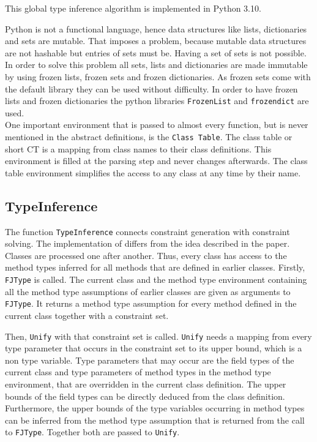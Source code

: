 This global type inference algorithm is implemented in Python 3.10.

Python is not a functional language, hence data structures like lists, dictionaries and sets are mutable. That imposes a problem, because mutable data structures are not hashable but entries of sets must be. Having a set of sets is not possible.
In order to solve this problem all sets, lists and dictionaries are made immutable by using frozen lists, frozen sets and frozen dictionaries. As frozen sets come with the default library they can be used without difficulty. In order to have frozen lists and frozen dictionaries the python libraries \verb|FrozenList| and \verb|frozendict| are used.\\
One important environment that is passed to almost every function, but is never mentioned in the abstract definitions, is the \verb|Class Table|. The class table or short CT is a mapping from class names to their class definitions. This environment is filled at the parsing step and never changes afterwards. The class table environment simplifies the access to any class at any time by their name.\\

\subsection{TypeInference}

The function \verb|TypeInference| connects constraint generation with constraint solving. The implementation of differs from the idea described in the paper.
Classes are processed one after another. Thus, every class has access to the method types inferred for all methods that are defined in earlier classes.
Firstly, \verb|FJType| is called. The current class and the method type environment containing all the method type assumptions of earlier classes are given as arguments to \verb|FJType|. It returns a method type assumption for every
method defined in the current class together with a constraint set.

Then, \verb|Unify| with that constraint set is called. \verb|Unify| needs a mapping from every type parameter that occurs in the constraint set to its upper bound, which is a non type variable.
Type parameters that may occur are the field types of the current class and type parameters of method types in the method type environment, that are overridden in the current class definition.
The upper bounds of the field types can be directly deduced from the class definition. Furthermore, the upper bounds of the type variables occurring in method types can be inferred from the method type assumption that is returned from the call to \verb|FJType|.
Together both are passed to \verb|Unify|.

